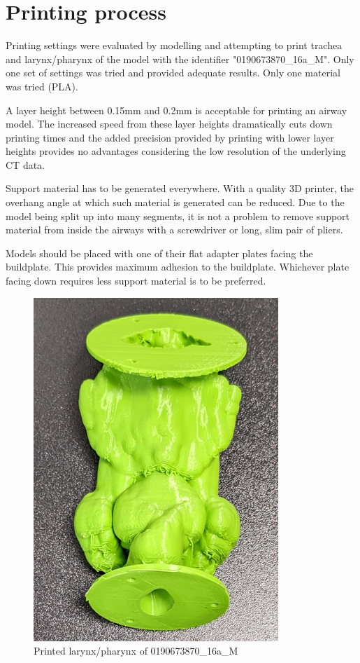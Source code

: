 \documentclass[MME,Projekt,english]{twbook}%
\begin{document}
\section{Printing process}

Printing settings were evaluated by modelling and attempting to print trachea and larynx/pharynx of the model with the identifier "0190673870\_16a\_M". Only one set of settings was tried and provided adequate results. Only one material was tried (PLA).

A layer height between 0.15mm and 0.2mm is acceptable for printing an airway model. The increased speed from these layer heights dramatically
cuts down printing times and the added precision provided by printing with lower layer heights provides no advantages considering
the low resolution of the underlying CT data.

Support material has to be generated everywhere. With a quality 3D printer, the overhang angle at which such material is generated
can be reduced. Due to the model being split up into many segments, it is not a problem to remove support material from inside the airways
with a screwdriver or long, slim pair of pliers.

Models should be placed with one of their flat adapter plates facing the buildplate. This provides maximum adhesion to the buildplate.
Whichever plate facing down requires less support material is to be preferred.

\begin{figure}[!htbp]
	\centering
	\includegraphics[width=.5\linewidth]{images/larynx_pharynx.png}
	\caption{Printed larynx/pharynx of 0190673870\_16a\_M}\label{larynx_pharynx}
\end{figure}
\end{document}
